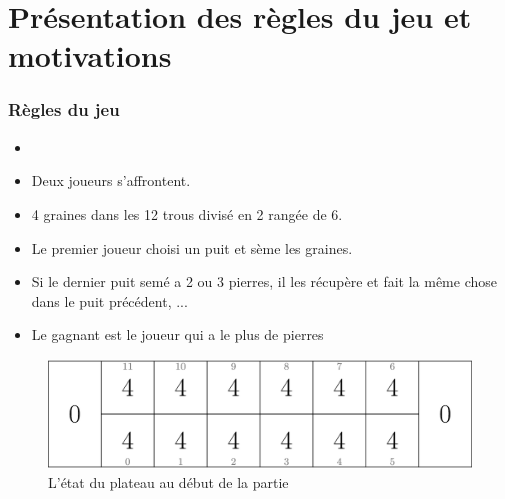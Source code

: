 \message{ !name(test.tex)}\documentclass{beamer}
\begin{document}
\section{Présentation des règles du jeu et motivations}
\begin{frame}
  \frametitle{Règles du jeu}
  \begin{minipage}[t]{0.5\linewidth}
    \begin{itemize}
    \item<Règles du jeu>
    \item Deux joueurs s'affrontent.
    \item 4 graines dans les 12 trous divisé en 2 rangée de 6.
    \item Le premier joueur choisi un puit et sème les graines.
    \item Si le dernier puit semé a 2 ou 3 pierres, il les récupère et fait la même chose dans le puit précédent, ...
      \item Le gagnant est le joueur qui a le plus de pierres
    \end{itemize}
  \end{minipage}
  \hfill 
  \begin{minipage}[t]{0.49\linewidth}
    \begin{figure}
      \centering
      \includegraphics[width=1.05\linewidth]{ressources/p_debut.jpg}
      \caption{L'état du plateau au début de la partie}
    \end{figure}
    
  \end{minipage}
  
\end{frame}
\end{document}

